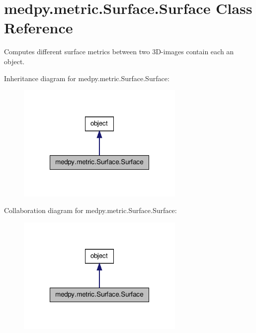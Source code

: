\hypertarget{classmedpy_1_1metric_1_1Surface_1_1Surface}{
\section{medpy.metric.Surface.Surface Class Reference}
\label{classmedpy_1_1metric_1_1Surface_1_1Surface}
}


Computes different surface metrics between two 3D-\/images contain each an object.  




Inheritance diagram for medpy.metric.Surface.Surface:\nopagebreak
\begin{figure}[H]
\begin{center}
\leavevmode
\includegraphics[width=228pt]{classmedpy_1_1metric_1_1Surface_1_1Surface__inherit__graph}
\end{center}
\end{figure}


Collaboration diagram for medpy.metric.Surface.Surface:\nopagebreak
\begin{figure}[H]
\begin{center}
\leavevmode
\includegraphics[width=228pt]{classmedpy_1_1metric_1_1Surface_1_1Surface__coll__graph}
\end{center}
\end{figure}
